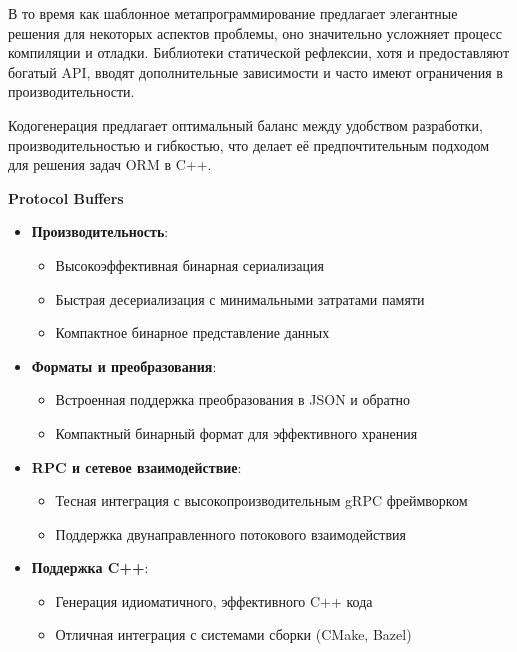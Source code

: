         В то время как шаблонное метапрограммирование предлагает элегантные решения для некоторых аспектов проблемы, оно значительно усложняет процесс компиляции и отладки. Библиотеки статической рефлексии, хотя и предоставляют богатый API, вводят дополнительные зависимости и часто имеют ограничения в производительности.

        Кодогенерация предлагает оптимальный баланс между удобством разработки, производительностью и гибкостью, что делает её предпочтительным подходом для решения задач ORM в C++.


        \textbf{Protocol Buffers}

            \begin{itemize}
                \item \textbf{Производительность}:
                \begin{itemize}
                    \item Высокоэффективная бинарная сериализация
                    \item Быстрая десериализация с минимальными затратами памяти
                    \item Компактное бинарное представление данных
                \end{itemize}

                \item \textbf{Форматы и преобразования}:
                \begin{itemize}
                    \item Встроенная поддержка преобразования в JSON и обратно
                    \item Компактный бинарный формат для эффективного хранения
                \end{itemize}

                \item \textbf{RPC и сетевое взаимодействие}:
                \begin{itemize}
                    \item Тесная интеграция с высокопроизводительным gRPC фреймворком
                    \item Поддержка двунаправленного потокового взаимодействия
                \end{itemize}

                \item \textbf{Поддержка C++}:
                \begin{itemize}
                    \item Генерация идиоматичного, эффективного C++ кода
                    \item Отличная интеграция с системами сборки (CMake, Bazel)
                \end{itemize}


\end{itemize}
